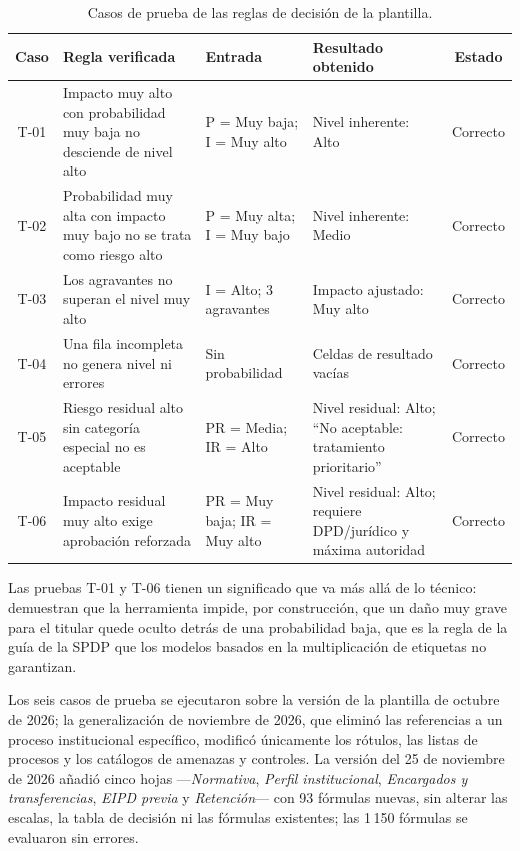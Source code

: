 \begin{table}[htbp]
  \centering
  \caption{Casos de prueba de las reglas de decisión de la plantilla.}
  \label{tab:pruebas}
  \scriptsize
  \renewcommand{\arraystretch}{1.2}
  \begin{tabularx}{\textwidth}{|c|L|>{\raggedright\arraybackslash}p{3.2cm}|>{\raggedright\arraybackslash}p{3.2cm}|c|}
    \hline
    \textbf{Caso} & \textbf{Regla verificada} & \textbf{Entrada} & \textbf{Resultado obtenido} & \textbf{Estado} \\
    \hline
    T-01 & Impacto muy alto con probabilidad muy baja no desciende de nivel alto & P = Muy baja; I = Muy alto & Nivel inherente: Alto & Correcto \\
    \hline
    T-02 & Probabilidad muy alta con impacto muy bajo no se trata como riesgo alto & P = Muy alta; I = Muy bajo & Nivel inherente: Medio & Correcto \\
    \hline
    T-03 & Los agravantes no superan el nivel muy alto & I = Alto; 3 agravantes & Impacto ajustado: Muy alto & Correcto \\
    \hline
    T-04 & Una fila incompleta no genera nivel ni errores & Sin probabilidad & Celdas de resultado vacías & Correcto \\
    \hline
    T-05 & Riesgo residual alto sin categoría especial no es aceptable & PR = Media; IR = Alto & Nivel residual: Alto; ``No aceptable: tratamiento prioritario'' & Correcto \\
    \hline
    T-06 & Impacto residual muy alto exige aprobación reforzada & PR = Muy baja; IR = Muy alto & Nivel residual: Alto; requiere DPD/jurídico y máxima autoridad & Correcto \\
    \hline
  \end{tabularx}
  \raggedright
\end{table}

Las pruebas T-01 y T-06 tienen un significado que va más allá de lo técnico: demuestran que la herramienta impide, por construcción, que un daño muy grave para el titular quede oculto detrás de una probabilidad baja, que es la regla de la guía de la SPDP que los modelos basados en la multiplicación de etiquetas no garantizan.


Los seis casos de prueba se ejecutaron sobre la versión de la plantilla de octubre de 2026; la generalización de noviembre de 2026, que eliminó las referencias a un proceso institucional específico, modificó únicamente los rótulos, las listas de procesos y los catálogos de amenazas y controles. La versión del 25 de noviembre de 2026 añadió cinco hojas ---\textit{Normativa}, \textit{Perfil institucional}, \textit{Encargados y transferencias}, \textit{EIPD previa} y \textit{Retención}--- con 93 fórmulas nuevas, sin alterar las escalas, la tabla de decisión ni las fórmulas existentes; las 1\,150 fórmulas se evaluaron sin errores.

